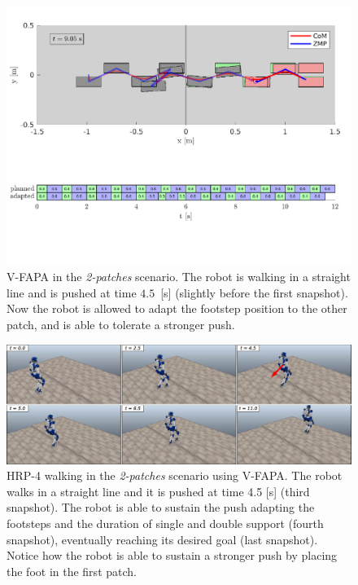 \begin{figure}
    \includegraphics[trim={0 2.2cm 0 8.6cm},clip,width=\textwidth]{figures/two-patches-mixed-integer-completing-task.pdf}
    \caption{V-FAPA in the {\em 2-patches} scenario. The robot is walking
        in a straight line and is pushed at time $4.5$~[s] (slightly before the
        first snapshot). Now the robot is allowed to adapt the footstep position
        to the other patch, and is able to tolerate a stronger push.
    }
    \label{fig:FAPA:matlab_2pacmi}
\end{figure}

\begin{figure}
    \centering
    \includegraphics[width=\textwidth]{figures/two-patches-push-mixed-integer-snapshots.jpeg}
    \caption{HRP-4 walking in the \textit{2-patches} scenario using V-FAPA.
        The robot walks in a straight line and it is pushed at time 4.5 [s]
        (third snapshot). The robot is able to sustain the push adapting the
        footsteps and the duration of single and double support (fourth
        snapshot), eventually reaching its desired goal (last snapshot).
        Notice how the robot is able to sustain a stronger push by placing
        the foot in the first patch.
    }
    \label{fig:FAPA:sim3:snapshots}
\end{figure}

